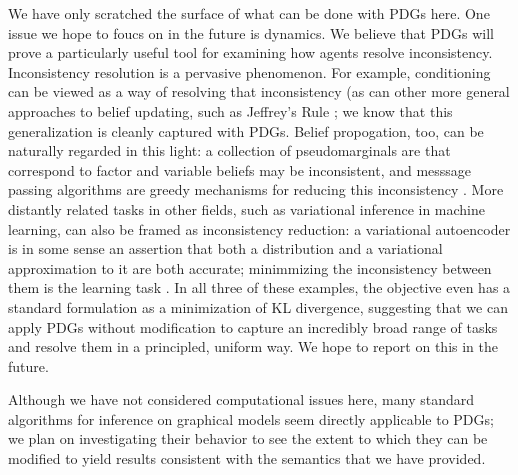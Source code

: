 \documentclass[letterpaper]{article} %
\theoremstyle{plain}
\theoremstyle{definition}
\theoremstyle{remark}
\begin{document}
We have only scratched the surface of what can be done with PDGs here. 
%
One issue we hope to foucs on in the future is dynamics.  We believe
that PDGs will prove a particularly useful tool for examining how agents resolve
inconsistency.
Inconsistency resolution is a pervasive phenomenon.
For example, 
conditioning can be
viewed as a way of resolving that inconsistency (as can other more
general approaches to belief updating, such as Jeffrey's Rule
\cite{Jeffrey68};
we know that this generalization is cleanly captured with PDGs. 
Belief propogation, too, 
can be naturally regarded in this light: a collection of pseudomarginals are
that correspond to factor and variable beliefs may be inconsistent, and 
messsage passing algorithms are greedy mechanisms for reducing this inconsistency \cite{wainwright2008graphical}.
More distantly related tasks in other fields, such as variational inference in
machine learning, can also be framed as inconsistency reduction: a variational 
autoencoder is in some sense an assertion that both a distribution
and a variational approximation to it are both accurate; minimmizing
the inconsistency between them is the learning task \cite{kingma2013autoencoding}. In all three of these
examples, the objective even has a standard formulation as a minimization of KL divergence,
suggesting that we can apply PDGs without modification to capture an incredibly 
broad range of tasks and resolve them in a principled, uniform way.
We hope to report on this in the future.


Although we have not considered computational issues here, many
standard algorithms for inference on graphical models
seem directly applicable to PDGs; we plan on investigating their
behavior to see the extent to which they can be modified to yield
results consistent with the semantics that
we have provided.
\end{document}
